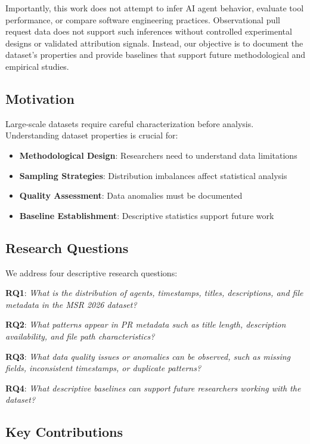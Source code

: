 \documentclass[conference]{IEEEtran}
\begin{document}
Importantly, this work does not attempt to infer AI agent behavior, evaluate tool performance, or compare software engineering practices. Observational pull request data does not support such inferences without controlled experimental designs or validated attribution signals. Instead, our objective is to document the dataset's properties and provide baselines that support future methodological and empirical studies.

\subsection{Motivation}

Large-scale datasets require careful characterization before analysis. Understanding dataset properties is crucial for:
\begin{itemize}
    \item \textbf{Methodological Design}: Researchers need to understand data limitations
    \item \textbf{Sampling Strategies}: Distribution imbalances affect statistical analysis
    \item \textbf{Quality Assessment}: Data anomalies must be documented
    \item \textbf{Baseline Establishment}: Descriptive statistics support future work
\end{itemize}

\subsection{Research Questions}

We address four descriptive research questions:

\textbf{RQ1}: \textit{What is the distribution of agents, timestamps, titles, descriptions, and file metadata in the MSR 2026 dataset?}

\textbf{RQ2}: \textit{What patterns appear in PR metadata such as title length, description availability, and file path characteristics?}

\textbf{RQ3}: \textit{What data quality issues or anomalies can be observed, such as missing fields, inconsistent timestamps, or duplicate patterns?}

\textbf{RQ4}: \textit{What descriptive baselines can support future researchers working with the dataset?}

\subsection{Key Contributions}
\end{document}

